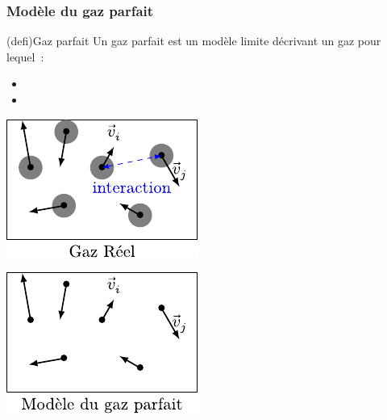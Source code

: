 \documentclass[../../main/main.tex]{subfiles}
\begin{document}
\subsubsection{Modèle du gaz parfait}

\begin{tcbraster}[raster columns=2, raster equal height=rows]
	\begin{tcb}[label=def:gp](defi){Gaz parfait}
		Un gaz parfait est un modèle limite décrivant un gaz pour lequel~:
		\begin{itemize}
			\item
			\item
		\end{itemize}
		\begin{minipage}{0.49\linewidth}
			\centering
			\includegraphics[width=\linewidth]{gaz_reel}
		\end{minipage}
		\begin{minipage}{0.49\linewidth}
			\centering
			\includegraphics[width=\linewidth]{gaz_prft}

\end{minipage}
\end{tcb}
\end{tcbraster}
\end{document}
